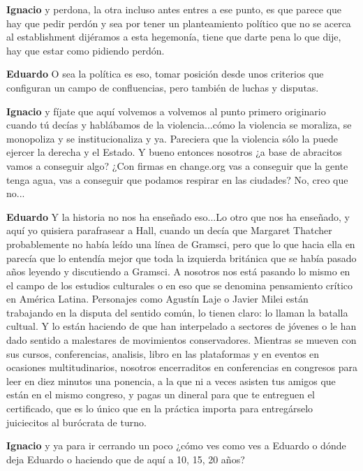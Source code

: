 \documentclass[
  spanish,
  11pt,
  a4paper,
]{scrbook}
\newenvironment{transcripcion}{
    \begin{list}{}{
        \setlength{\leftmargin}{1.5em}  %
        \setlength{\rightmargin}{0em}
        \setlength{\itemsep}{0.2em}     %
        \setlength{\parsep}{0.0em}
        \setlength{\listparindent}{0pt}
    }
}{
    \end{list}
}
\newcommand{\personaje}[1]{\textbf{#1}\quad}
\begin{document}
\begin{transcripcion}
\item \personaje{Ignacio} y perdona, la otra incluso antes entres a ese punto, es que parece que hay que pedir perdón y sea por tener un planteamiento político que no se acerca al establishment dijéramos a esta hegemonía, tiene que darte pena lo que dije, hay que estar como pidiendo perdón.

\item \personaje{Eduardo} O sea la política es eso, tomar posición desde unos criterios que configuran un campo de confluencias, pero también de luchas y disputas.

\item \personaje{Ignacio} y fíjate que aquí volvemos a volvemos al punto primero originario cuando tú decías y hablábamos de la violencia...cómo la violencia se moraliza, se monopoliza y se institucionaliza y ya. Pareciera que la violencia sólo la puede ejercer la derecha y el Estado. Y bueno entonces nosotros ¿a base de abracitos vamos a conseguir algo? ¿Con firmas en change.org vas a conseguir que la gente tenga agua, vas a conseguir que podamos respirar en las ciudades? No, creo que no...

\item \personaje{Eduardo} Y la historia no nos ha enseñado eso...Lo otro que nos ha enseñado, y aquí yo quisiera parafrasear a Hall, cuando un decía que Margaret Thatcher probablemente no había leído una línea de Gramsci, pero que lo que hacia ella en parecía que lo entendía mejor que toda la izquierda británica que se había pasado años leyendo y discutiendo a Gramsci. A nosotros nos está pasando lo mismo en el campo de los estudios culturales o en eso que se denomina pensamiento crítico en América Latina. Personajes como Agustín Laje o Javier Milei están trabajando en la disputa del sentido común, lo tienen claro: lo llaman la batalla cultual. Y lo están haciendo de que han interpelado a sectores de jóvenes o le han dado sentido a malestares de movimientos conservadores. Mientras se mueven con sus cursos, conferencias, analisis, libro en las plataformas y en eventos en ocasiones multitudinarios, nosotros encerraditos en conferencias en congresos para leer en diez minutos una ponencia, a la que ni a veces asisten tus amigos que están en el mismo congreso, y pagas un dineral para que te entreguen el certificado, que es lo único que en la práctica importa para entregárselo juiciecitos al burócrata de turno.

\item \personaje{Ignacio} y ya para ir cerrando un poco ¿cómo ves como ves a Eduardo o dónde deja Eduardo o haciendo que de aquí a 10, 15, 20 años?


\end{transcripcion}
\end{document}
